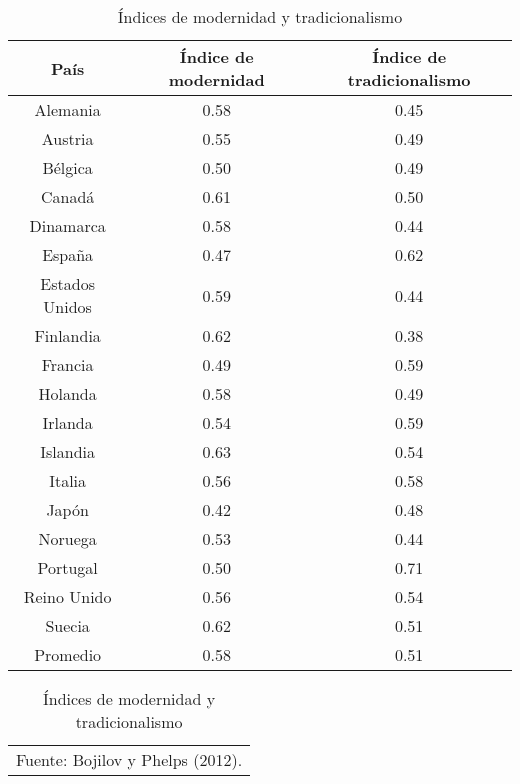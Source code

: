 \begin{table}[H]
\centering
\caption{Índices de modernidad y tradicionalismo}
\label{PHEL}
\begin{tabular}{|ccc|}
\hline
 País & Índice de modernidad & Índice de tradicionalismo  \\ 
\hline
Alemania & 0.58 & 0.45 \\
Austria & 0.55 & 0.49  \\
Bélgica & 0.50 & 0.49  \\
Canadá & 0.61 & 0.50 \\
Dinamarca & 0.58 & 0.44 \\ 
España & 0.47 & 0.62 \\
Estados Unidos & 0.59 & 0.44  \\
Finlandia & 0.62 & 0.38 \\
Francia & 0.49 & 0.59 \\ 
Holanda & 0.58 & 0.49 \\ 
Irlanda & 0.54 & 0.59  \\
Islandia & 0.63 & 0.54 \\
Italia & 0.56 & 0.58  \\
Japón & 0.42 & 0.48 \\
Noruega & 0.53 & 0.44 \\
Portugal & 0.50 & 0.71 \\ 
Reino Unido & 0.56 & 0.54  \\
Suecia & 0.62 & 0.51 \\
Promedio & 0.58 & 0.51 \\
\hline
\end{tabular}

\begin{tabular}{c}
\footnotesize{Fuente: Bojilov y Phelps (2012).}
\end{tabular}

\end{table}

